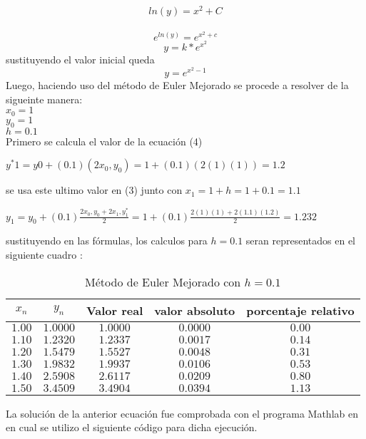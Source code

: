 \documentclass[12 pt,letterpaper]{article}
\begin{document}
\begin{itemize}
\begin{flushleft}
			\[ln(y) = x^{2}+ C\]\\
			\[e^{ln(y)} = e^{x^{2}+c}\]
			\[y = k*e^{x^2}\]
			sustituyendo el valor inicial queda\\
			\[y = e^{x^2-1}\]
			Luego, haciendo uso del método de Euler Mejorado se procede a resolver de la sigueinte manera:\\
			$x_{0}=1$\\
			$y_{0}=1$\\
			$h=0.1$\\
			Primero se calcula el valor de la ecuación (4)
			\vspace{0.5mm} %
			\begin{flushleft}
				\begin{center}
					$y^*{1}=y{0}+(0.1)(2x_{0},y_{0})=1+(0.1)(2(1)(1))=1.2$
				\end{center}
			\end{flushleft}\vspace{0.1Cm}
			se usa este ultimo valor en (3) junto con $ x_{1}=1+h=1+0.1=1.1$
			\begin{flushleft}
				$y_{1}=y_{0}+(0.1) \frac{2x_{0},y_{0}+2x_{1},y^*_{1}}{2}=1+(0.1) \frac{2(1)(1)+2(1.1)(1.2)}{2}=1.232$
			\end{flushleft}
			
			sustituyendo en las fórmulas, los calculos para $h=0.1$ seran representados en el siguiente cuadro :\\
		\end{flushleft}
		\begin{table}[H]
			\centering
			\begin{tabular}{|c|c|c|c|c|}
				\hline
				$x_{n}$& $y_{n}$ & Valor real&valor absoluto& porcentaje relativo\\
				\hline
				$1.00$& $1.0000$ &$1.0000$& $0.0000$& $0.00$\\
				$1.10$& $1.2320$& $1.2337$&$ 0.0017$& $0.14$\\
				$1.20 $&$1.5479$&$ 1.5527 $&$0.0048$&$ 0.31$\\
				$1.30$&$ 1.9832$&$ 1.9937$&$ 0.0106$&$ 0.53$\\
				$1.40$&$ 2.5908$&$ 2.6117$&$ 0.0209 $&$0.80$\\
				$1.50 $&$3.4509$&$ 3.4904$&$ 0.0394$&$ 1.13$\\
				\hline
			\end{tabular}
			\caption{Método de Euler Mejorado con $h=0.1$}
			\label{}
		\end{table}
		La  solución de la anterior ecuación  fue comprobada con el programa Mathlab en en cual se utilizo el siguiente código para dicha ejecución.
		
	\end{itemize}
	
	
\end{document}
